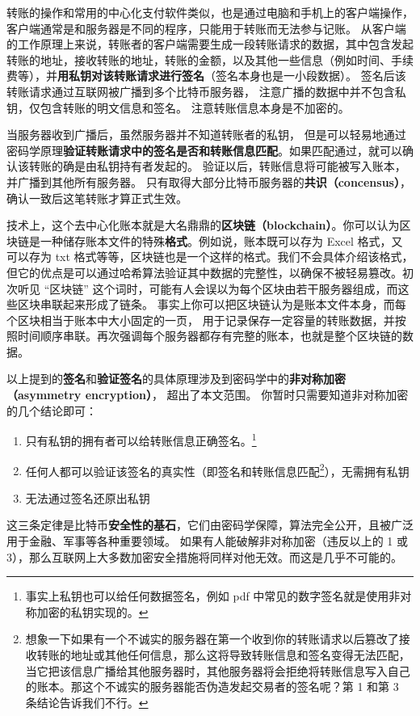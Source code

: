 转账的操作和常用的中心化支付软件类似，也是通过电脑和手机上的客户端操作，客户端通常是和服务器是不同的程序，只能用于转账而无法参与记账。 从客户端的工作原理上来说，转账者的客户端需要生成一段转账请求的数据，其中包含发起转账的地址，接收转账的地址，转账的金额，以及其他一些信息（例如时间、手续费等），并\textbf{用私钥对该转账请求进行签名}（签名本身也是一小段数据）。 签名后该转账请求通过互联网被广播到多个比特币服务器， 注意广播的数据中并不包含私钥，仅包含转账的明文信息和签名。 注意转账信息本身是不加密的。

当服务器收到广播后，虽然服务器并不知道转账者的私钥， 但是可以轻易地通过密码学原理\textbf{验证转账请求中的签名是否和转账信息匹配}。如果匹配通过，就可以确认该转账的确是由私钥持有者发起的。 验证以后，转账信息将可能被写入账本，并广播到其他所有服务器。 只有取得大部分比特币服务器的\textbf{共识（concensus）}， 确认一致后这笔转账才算正式生效。

技术上，这个去中心化账本就是大名鼎鼎的\textbf{区块链（blockchain）}。你可以认为区块链是一种储存账本文件的特殊\textbf{格式}。例如说，账本既可以存为 Excel 格式，又可以存为 txt 格式等等，区块链也是一个这样的格式。我们不会具体介绍该格式，但它的优点是可以通过哈希算法验证其中数据的完整性，以确保不被轻易篡改。初次听见 “区块链” 这个词时，可能有人会误以为每个区块由若干服务器组成，而这些区块串联起来形成了链条。 事实上你可以把区块链认为是账本文件本身，而每个区块相当于账本中大小固定的一页， 用于记录保存一定容量的转账数据，并按照时间顺序串联。再次强调每个服务器都存有完整的账本，也就是整个区块链的数据。

以上提到的\textbf{签名}和\textbf{验证签名}的具体原理涉及到密码学中的\textbf{非对称加密（asymmetry encryption）}， 超出了本文范围。 你暂时只需要知道非对称加密的几个结论即可：
\begin{enumerate}
\item 只有私钥的拥有者可以给转账信息正确签名。\footnote{事实上私钥也可以给任何数据签名，例如 pdf 中常见的数字签名就是使用非对称加密的私钥实现的。}
\item 任何人都可以验证该签名的真实性（即签名和转账信息匹配\footnote{想象一下如果有一个不诚实的服务器在第一个收到你的转账请求以后篡改了接收转账的地址或其他任何信息，那么这将导致转账信息和签名变得无法匹配，当它把该信息广播给其他服务器时，其他服务器将会拒绝将转账信息写入自己的账本。那这个不诚实的服务器能否伪造发起交易者的签名呢？第 1 和第 3 条结论告诉我们不行。}），无需拥有私钥
\item 无法通过签名还原出私钥
\end{enumerate}
这三条定律是比特币\textbf{安全性的基石}，它们由密码学保障，算法完全公开，且被广泛用于金融、军事等各种重要领域。 如果有人能破解非对称加密（违反以上的 1 或 3），那么互联网上大多数加密安全措施将同样对他无效。而这是几乎不可能的。

